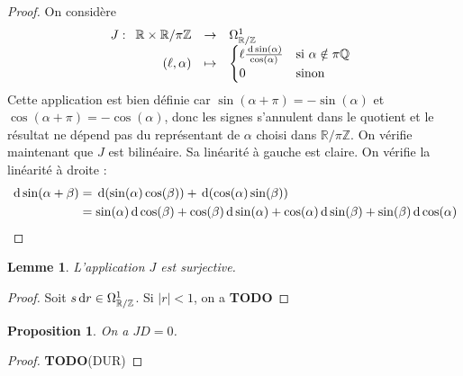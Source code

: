 \documentclass{article}
\newcommand{\Z}{\mathbb{Z}}
\newcommand{\Q}{\mathbb{Q}}
\newcommand{\R}{\mathbb{R}}
\renewcommand{\d}{{\rm \, d}}
\newcommand{\todo}{\textbf{TODO}}
\newcommand{\applic}[4]{\begin{array}[t]{rcl}
#1 & \to & #2 \\
#3 & \mapsto & #4
\end{array}}
\theoremstyle{plain}
\newtheorem{proposition}[theorem]{Proposition}
\newtheorem{lemma}[theorem]{Lemme}
\theoremstyle{definition}
\theoremstyle{remark}
\begin{document}
\begin{proof}
    On considère
    \[J : \applic{\R \times \R/\pi \Z}{\Omega_{\R/\Z}^1}{(\ell,\alpha)}{\begin{cases} \ell \frac{\d \sin(\alpha)}{\cos(\alpha)} & \text{si $\alpha \notin \pi \Q$} \\ 0 & \text{sinon}\end{cases}}\]
    Cette application est bien définie car $\sin(\alpha + \pi) = - \sin(\alpha)$ et $\cos(\alpha + \pi) = - \cos(\alpha)$, donc les signes s'annulent dans le quotient et le résultat ne dépend pas du représentant de $\alpha$ choisi dans $\R/\pi\Z$. On vérifie maintenant que $J$ est bilinéaire. Sa linéarité à gauche est claire. On vérifie la linéarité à droite :
    \begin{align*}
        \d \sin(\alpha + \beta) & = \d (\sin (\alpha) \cos(\beta)) + \d (\cos(\alpha) \sin (\beta)) \\
        & = \sin(\alpha) \d \cos(\beta) + \cos(\beta) \d \sin (\alpha) + \cos(\alpha) \d \sin(\beta) + \sin(\beta) \d \cos (\alpha)
    \end{align*}
\end{proof}

\begin{lemma}
    L'application $J$ est surjective.
\end{lemma}

\begin{proof}
    Soit $s \d r \in \Omega_{\R/\Z}^1$. Si $|r| < 1$, on a \todo
\end{proof}

\begin{proposition}
    On a $JD = 0$.
\end{proposition}

\begin{proof}
    \todo (DUR)
\end{proof}
\end{document}
